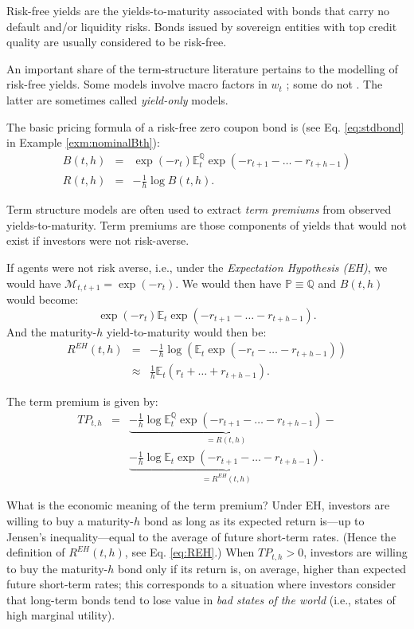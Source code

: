 \documentclass[
  12pt,
]{book}
\theoremstyle{definition}
\theoremstyle{definition}
\theoremstyle{definition}
\theoremstyle{definition}
\theoremstyle{remark}
\begin{document}
Risk-free yields are the yields-to-maturity associated with bonds that carry no default and/or liquidity risks. Bonds issued by sovereign entities with top credit quality are usually considered to be risk-free.

An important share of the term-structure literature pertains to the modelling of risk-free yields. Some models involve macro factors in \(w_t\) \citep{Ang_Piazzesi_2003}; some do not \citep{Duffie_Singleton_1997}. The latter are sometimes called \emph{yield-only} models.

The basic pricing formula of a risk-free zero coupon bond is (see Eq. \eqref{eq:stdbond} in Example \ref{exm:nominalBth}):
\begin{eqnarray}
B(t,h) &=& \exp(-r_{t}) \mathbb{E}^{\mathbb{Q}}_t \exp(-r_{t+1}-\dots-r_{t+h-1})\\
R(t,h) &=& - \frac{1}{h} \log B(t,h). \label{eq:stdbondRFchapter}
\end{eqnarray}

Term structure models are often used to extract \emph{term premiums} from observed yields-to-maturity. Term premiums are those components of yields that would not exist if investors were not risk-averse.

If agents were not risk averse, i.e., under the \emph{Expectation Hypothesis (EH)}, we would have \(\mathcal{M}_{t,t+1} = \exp(- r_t)\). We would then have \(\mathbb{P} \equiv \mathbb{Q}\) and \(B(t,h)\) would become:
\begin{equation}
\exp(-r_{t}) \mathbb{E}_t \exp(-r_{t+1}-\dots-r_{t+h-1}).\label{eq:stdbondRFchapterP}
\end{equation}
And the maturity-\(h\) yield-to-maturity would then be:
\begin{eqnarray}
R^{EH}(t,h) &=& -\frac{1}{h}\log \left( \mathbb{E}_t \exp(-r_t-\dots-r_{t+h-1})\right)\nonumber\\
&\approx& \frac{1}{h}\mathbb{E}_t(r_t + \dots + r_{t+h-1}).\label{eq:REH}
\end{eqnarray}

The term premium is given by:
\begin{eqnarray}
TP_{t,h} &=& \underbrace{- \frac{1}{h} \log  \mathbb{E}^{\mathbb{Q}}_t \exp(-r_{t+1}-\dots-r_{t+h-1})}_{=R(t,h)} - \nonumber \\
&& \underbrace{- \frac{1}{h}  \log  \mathbb{E}_t \exp(-r_{t+1}-\dots-r_{t+h-1}).}_{=R^{EH}(t,h)}\label{eq:TP}
\end{eqnarray}

What is the economic meaning of the term premium? Under EH, investors are willing to buy a maturity-\(h\) bond as long as its expected return is---up to Jensen's inequality---equal to the average of future short-term rates. (Hence the definition of \(R^{EH}(t,h)\), see Eq. \eqref{eq:REH}.) When \(TP_{t,h}>0\), investors are willing to buy the maturity-\(h\) bond only if its return is, on average, higher than expected future short-term rates; this corresponds to a situation where investors consider that long-term bonds tend to lose value in \emph{bad states of the world} (i.e., states of high marginal utility).
\end{document}
